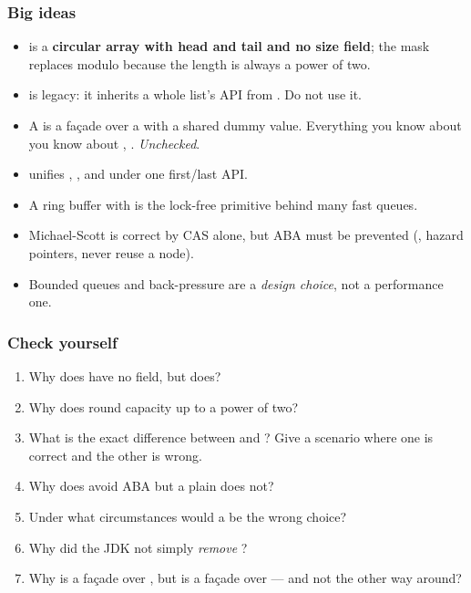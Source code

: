 \documentclass[aspectratio=169,10pt,compress]{beamer}
\begin{document}
\begin{frame}[t,fragile] \frametitle{Big ideas}
  \begin{itemize}
    \item {} is a \textbf{circular array with head and tail
          and no size field}; the mask replaces modulo because the length
          is always a power of two.
    \item {} is legacy: it inherits a whole list's API
          from . Do not use it.
    \item A  is a façade over a  with a shared
          dummy value. Everything you know about  you
          know about , . \emph{Unchecked}.
    \item {} unifies , ,
          and  under one first/last API.
    \item A ring buffer with  is the lock-free primitive
          behind many fast queues.
    \item Michael-Scott is correct by CAS alone, but ABA must be
          prevented (, hazard pointers,
          never reuse a node).
    \item Bounded queues and back-pressure are a \emph{design choice},
          not a performance one.
  \end{itemize}
\end{frame}




\begin{frame}[t,fragile] \frametitle{Check yourself}
  \begin{enumerate}\small
    \item Why does  have no  field, but
           does?
    \item Why does  round capacity up to a power of two?
    \item What is the exact difference between  and
          ? Give a scenario where one is correct and
          the other is wrong.
    \item Why does  avoid ABA but a plain
           does not?
    \item Under what circumstances would a 
          be the wrong choice?
    \item Why did the JDK not simply \emph{remove} ?
    \item Why is  a façade over , but
           is a façade over  --- and not
          the other way around?
  \end{enumerate}
\end{frame}
\end{document}
